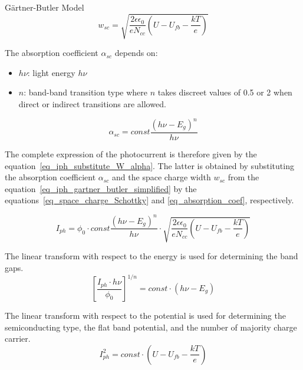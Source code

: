 \documentclass[10pt,compress]{beamer}
\begin{document}
\begin{frame}[allowframebreaks=1.0]{Gärtner-Butler Model}
        \begin{equation}
            w_{sc} = \sqrt{ \frac{2\epsilon \epsilon _0}{e N_{cc}} (U-U_{fb}-\frac{kT}{e}) }
            \label{eq_space_charge_Schottky}
        \end{equation}
        
        The absorption coefficient $\alpha _{sc}$ depends on:
        \begin{itemize}
            \item $h\nu$: light energy $h\nu$
            \item $n$: band-band transition type where $n$ takes discreet values of 0.5 or 2 when direct or indirect transitions are allowed.
        \end{itemize}

        \begin{equation}
            \alpha _{sc} = const \frac{(h\nu - E_g)^n}{h\nu}
            \label{eq_absorption_coef}
        \end{equation}

        \framebreak
        The complete expression of the photocurrent is therefore given by the 
        equation~\ref{eq_iph_substitute_W_alpha}. 
        The latter is obtained by substituting the absorption coefficient $\alpha _{sc}$ 
        and the space charge width $w_{sc}$ from the 
        equation~\ref{eq_iph_gartner_butler_simplified}
        by the equations~\ref{eq_space_charge_Schottky} and \ref{eq_absorption_coef}, 
        respectively.

        \begin{equation}
            I_{ph} = \phi _0 \cdot const \frac{(h\nu - E_g)^n}{h\nu}
                \cdot \sqrt{ \frac{2\epsilon \epsilon _0}{e N_{cc}} (U-U_{fb}-\frac{kT}{e}) }
            \label{eq_iph_substitute_W_alpha}
        \end{equation}
        
        The linear transform with respect to the energy is used for determining the band gaps. 
        \begin{equation}
            \left[ \frac{I_{ph} \cdot h\nu}{\phi _0} \right] ^{1/n} = const \cdot (h\nu - E_g)
            \label{eq_iph_linear_transform}
        \end{equation}
        
        The linear transform with respect to the potential  is used for determining 
        the semiconducting type, the flat band potential, 
        and the number of majority charge carrier.
        \begin{equation}
            I_{ph}^2 = const \cdot (U-U_{fb}-\frac{kT}{e})
            \label{eq_iph_linear_transform_potential}
        \end{equation}
    \end{frame}
\end{document}
